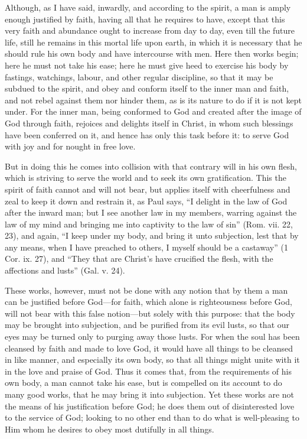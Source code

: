Although, as I have said, inwardly, and according to the spirit, a man is
amply enough justified by faith, having all that he requires to have,
except that this very faith and abundance ought to increase from day to
day, even till the future life, still he remains in this mortal life upon
earth, in which it is necessary that he should rule his own body and have
intercourse with men. Here then works begin; here he must not take his
ease; here he must give heed to exercise his body by fastings, watchings,
labour, and other regular discipline, so that it may be subdued to the
spirit, and obey and conform itself to the inner man and faith, and not
rebel against them nor hinder them, as is its nature to do if it is not
kept under. For the inner man, being conformed to God and created after
the image of God through faith, rejoices and delights itself in Christ, in
whom such blessings have been conferred on it, and hence has only this
task before it: to serve God with joy and for nought in free love.

But in doing this he comes into collision with that contrary will in his
own flesh, which is striving to serve the world and to seek its own
gratification. This the spirit of faith cannot and will not bear, but
applies itself with cheerfulness and zeal to keep it down and restrain it,
as Paul says, ``I delight in the law of God after the inward man; but I see
another law in my members, warring against the law of my mind and bringing
me into captivity to the law of sin'' (Rom. vii. 22, 23), and again, ``I
keep under my body, and bring it unto subjection, lest that by any means,
when I have preached to others, I myself should be a castaway'' (1 Cor. ix.
27), and ``They that are Christ's have crucified the flesh, with the
affections and lusts'' (Gal. v. 24).

These works, however, must not be done with any notion that by them a man
can be justified before God—for faith, which alone is righteousness
before God, will not bear with this false notion—but solely with
this purpose: that the body may be brought into subjection, and be
purified from its evil lusts, so that our eyes may be turned only to
purging away those lusts. For when the soul has been cleansed by faith and
made to love God, it would have all things to be cleansed in like manner,
and especially its own body, so that all things might unite with it in the
love and praise of God. Thus it comes that, from the requirements of his
own body, a man cannot take his ease, but is compelled on its account to
do many good works, that he may bring it into subjection. Yet these works
are not the means of his justification before God; he does them out of
disinterested love to the service of God; looking to no other end than to
do what is well-pleasing to Him whom he desires to obey most dutifully in
all things.

